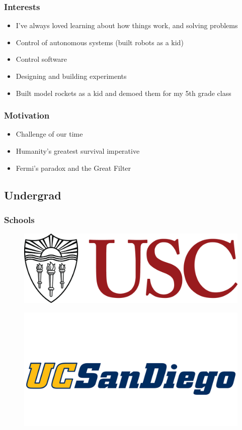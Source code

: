 \documentclass[aspectratio=169]{beamer}
\begin{document}
\begin{frame}
  \frametitle{Interests} 
  \begin{itemize}
  \item I've always loved learning about how things work,
    and solving problems
  \item Control of autonomous systems (built robots as a kid)
  \item Control software
  \item Designing and building experiments
  \item Built model rockets as a kid and demoed them for my 5th grade
    class
  \end{itemize}
\end{frame}

\begin{frame}
  \frametitle{Motivation}
  \begin{itemize}
  \item Challenge of our time
  \item Humanity's greatest survival imperative
  \item Fermi's paradox and the Great Filter
  \end{itemize}
\end{frame}

\subsection{Undergrad}
\begin{frame}
  \frametitle{Schools}
  \begin{figure}
    \includegraphics[width=0.35\linewidth]{USC_Logo.png}
  \end{figure}

  \begin{figure}
    \includegraphics[width=0.35\linewidth]{ucsd-athletics-logo.png}
  \end{figure}
\end{frame}
\end{document}
